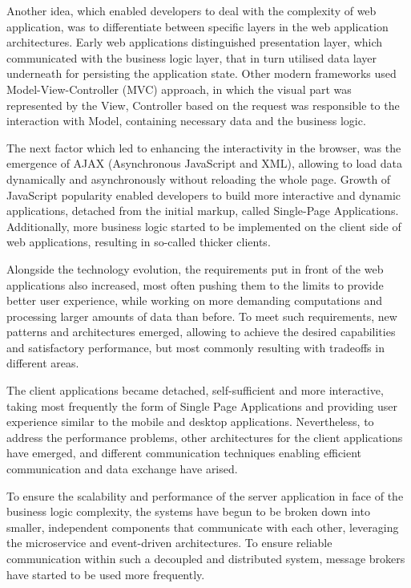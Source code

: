 Another idea, which enabled developers to deal with the complexity of web application, was to differentiate between specific layers in the web application architectures. Early web applications distinguished presentation layer, which communicated with the business logic layer, that in turn utilised data layer underneath for persisting the application state. Other modern frameworks used Model-View-Controller (MVC) approach, in which the visual part was represented by the View, Controller based on the request was responsible to the interaction with Model, containing necessary data and the business logic.

The next factor which led to enhancing the interactivity in the browser, was the emergence of AJAX (Asynchronous JavaScript and XML), allowing to load data dynamically and asynchronously without reloading the whole page. Growth of JavaScript popularity enabled developers to build more interactive and dynamic applications, detached from the initial markup, called Single-Page Applications. Additionally, more business logic started to be implemented on the client side of web applications, resulting in so-called thicker clients.

Alongside the technology evolution, the requirements put in front of the web applications also increased, most often pushing them to the limits to provide better user experience, while working on more demanding computations and processing larger amounts of data than before. To meet such requirements, new patterns and architectures emerged, allowing to achieve the desired capabilities and satisfactory performance, but most commonly resulting with tradeoffs in different areas.

The client applications became detached, self-sufficient and more interactive, taking most frequently the form of Single Page Applications and providing user experience similar to the mobile and desktop applications. Nevertheless, to address the performance problems, other architectures for the client applications have emerged, and different communication techniques enabling efficient communication and data exchange have arised.

To ensure the scalability and performance of the server application in face of the business logic complexity, the systems have begun to be broken down into smaller, independent components that communicate with each other, leveraging the microservice and event-driven architectures. To ensure reliable communication within such a decoupled and distributed system, message brokers have started to be used more frequently.

